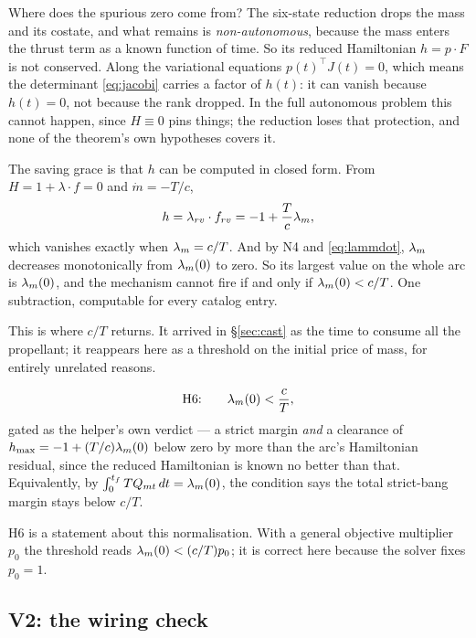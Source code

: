 \documentclass[11pt]{article}
\newcommand{\tf}{t_f}\newcommand{\R}{\mathbb{R}}
\newcommand{\Qmt}{Q_{mt}}
\begin{document}
\begin{intu}
Where does the spurious zero come from? The six-state reduction drops the mass
and its costate, and what remains is \emph{non-autonomous}, because the mass
enters the thrust term as a known function of time. So its reduced Hamiltonian
$h = p \cdot F$ is not conserved. Along the variational equations
$p(t)^\top J(t) = 0$, which means the determinant \eqref{eq:jacobi} carries a
factor of $h(t)$: it can vanish because $h(t) = 0$, not because the rank
dropped. In the full autonomous problem this cannot happen, since $H \equiv 0$
pins things; the reduction loses that protection, and none of the theorem's own
hypotheses covers it.

The saving grace is that $h$ can be computed in closed form. From
$H = 1 + \lambda \cdot f = 0$ and $\dot m = -T/c$,
\[
h = \lambda_{rv} \cdot f_{rv} = -1 + \frac{T}{c} \lambda_m,
\]
which vanishes exactly when $\lambda_m = c/T$. And by N4 and \eqref{eq:lammdot},
$\lambda_m$ decreases monotonically from $\lambda_m(0)$ to zero. So its largest value on
the whole arc is $\lambda_m(0)$, and the mechanism cannot fire if and only if
$\lambda_m(0) < c/T$. One subtraction, computable for every catalog entry.

This is where $c/T$ returns. It arrived in \S\ref{sec:cast} as the time to
consume all the propellant; it reappears here as a threshold on the initial
price of mass, for entirely unrelated reasons.
\end{intu}

\begin{rig}
\begin{equation}\label{eq:H6}
\text{H6:} \qquad \lambda_m(0) < \frac{c}{T},
\end{equation}
gated as the helper's own verdict --- a strict margin \emph{and} a clearance of
$h_{\max} = -1 + (T/c)\lambda_m(0)$ below zero by more than the arc's Hamiltonian
residual, since the reduced Hamiltonian is known no better than that.
Equivalently, by $\int_0^{\tf} T\Qmt \, dt = \lm(0)$, the condition says the
total strict-bang margin stays below $c/T$.
\end{rig}

\begin{warn}
H6 is a statement about this normalisation. With a general objective multiplier
$p_0$ the threshold reads $\lambda_m(0) < (c/T) p_0$; it is correct here because the
solver fixes $p_0 = 1$.
\end{warn}

\subsection{V2: the wiring check}\label{sec:V2}
\end{document}

